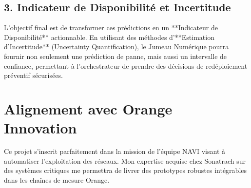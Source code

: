 \documentclass[11pt,a4paper]{article}
\begin{document}
\subsection{3. Indicateur de Disponibilité et Incertitude}
L'objectif final est de transformer ces prédictions en un **Indicateur de Disponibilité** actionnable. En utilisant des méthodes d'**Estimation d'Incertitude** (Uncertainty Quantification), le Jumeau Numérique pourra fournir non seulement une prédiction de panne, mais aussi un intervalle de confiance, permettant à l'orchestrateur de prendre des décisions de redéploiement préventif sécurisées.

\section{Alignement avec Orange Innovation}
Ce projet s'inscrit parfaitement dans la mission de l'équipe NAVI visant à automatiser l'exploitation des réseaux. Mon expertise acquise chez Sonatrach sur des systèmes critiques me permettra de livrer des prototypes robustes intégrables dans les chaînes de mesure Orange.
\end{document}
